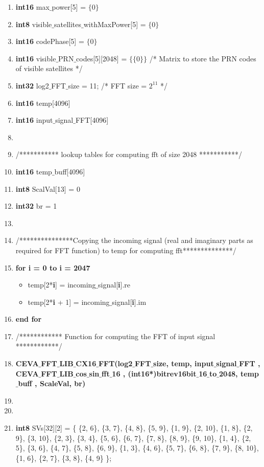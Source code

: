 \documentclass[journal,10pt,onecolumn]{article}
\begin{document}
\begin{enumerate}
    \item[] \textbf{int16} max$\_$power[5] = $\{0\}$ 
    \item[] \textbf{int8} visible$\_$satellites$\_$withMaxPower[5] = $\{0\}$
    \item[] \textbf{int16} codePhase[5] = $\{0\}$
    \item[] \textbf{int16} visible$\_$PRN$\_$codes[5][2048] = $\{\{0\}\}$  \hspace{5mm} /* Matrix to store the PRN codes of visible satellites */ 
    \item[] \textbf{int32} log2$\_$FFT$\_$size = 11;  \hspace{5mm} /* FFT size = $2^{11}$ */  
    \item[] \textbf{int16} temp[4096]     
    \item[] \textbf{int16} input$\_$signal$\_$FFT[4096]
    \item[]
    \item[] /*********** lookup tables for computing fft of size 2048 ***********/
    \item[] \textbf{int16} temp$\_$buff[4096]
    \item[] \textbf{int8}  ScalVal[13] = {0}
    \item[] \textbf{int32} br = 1
    \item []
    \item[] /***************Copying the incoming signal (real and imaginary parts as required for FFT function) to temp for computing fft**************/
    \item[] \textbf{for i = 0 to i = 2047}
    \begin{itemize}
        \item[] temp[2*\textbf{i}]     =  incoming$\_$signal[\textbf{i}].re
        \item[] temp[2*\textbf{i} + 1] =  incoming$\_$signal[\textbf{i}].im
    \end{itemize}
    \item[] \textbf{end for}
    \item[] /************ Function for computing the FFT of input signal ************/
    \item[] \textbf{CEVA$\_$FFT$\_$LIB$\_$CX16$\_$FFT(log2$\_$FFT$\_$size, temp, input$\_$signal$\_$FFT , CEVA$\_$FFT$\_$LIB$\_$cos$\_$sin$\_$fft$\_$16 , (int16*)bitrev16bit$\_$16$\_$to$\_$2048, temp$\_$buff , ScaleVal, br)}
    \item[]
    \item[]
    \item[] \textbf{int8} SVs[32][2] = \{
        \{2, 6\},
        \{3, 7\},
        \{4, 8\},
        \{5, 9\},
        \{1, 9\},
        \{2, 10\},
        \{1, 8\},
        \{2, 9\},
        \{3, 10\},
        \{2, 3\},
        \{3, 4\},
        \{5, 6\},
        \{6, 7\},
        \{7, 8\},
        \{8, 9\},
        \{9, 10\},
        \{1, 4\},
        \{2, 5\},
        \{3, 6\},
        \{4, 7\},
        \{5, 8\}, 
        \{6, 9\},
        \{1, 3\},
        \{4, 6\},
        \{5, 7\}, 
        \{6, 8\},
        \{7, 9\},
        \{8, 10\},
        \{1, 6\},
        \{2, 7\},
        \{3, 8\},
        \{4, 9\}
    \};
     

\end{enumerate}
\end{document}
